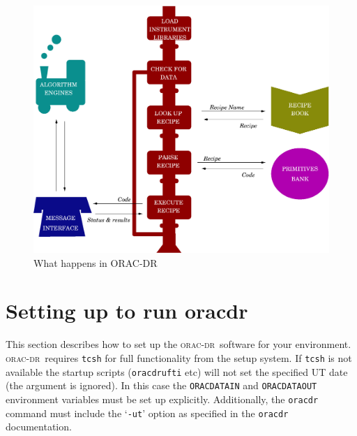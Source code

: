 \documentclass[twoside,11pt]{article}
\newcommand{\xlabel}[1]{}
\renewcommand{\_}{\texttt{\symbol{95}}}
\newcommand{\oracdr}{\textsc{orac-dr}}
\begin{document}
\begin{figure}
\includegraphics[width=\textwidth]{sun230_train.eps}
\caption{What happens in ORAC-DR}
\end{figure}


\section{\xlabel{setting_up_to_run_oracdr}Setting up to run oracdr\label{Setting_up_to_run_oracdr}}

This section describes how to set up the \oracdr\ software for your
environment. \oracdr\ requires \texttt{tcsh} for full functionality from the
setup system. If \texttt{tcsh} is not available the startup scripts
(\texttt{oracdr\_ufti} etc) will not set the specified UT date (the argument
is ignored). In this case the \texttt{ORAC\_DATA\_IN} and \texttt{ORAC\_DATA\_OUT}
environment variables must be set up explicitly. Additionally, the
\texttt{oracdr} command must include the `\texttt{-ut}' option as specified in the
\texttt{oracdr} documentation.
\end{document}
